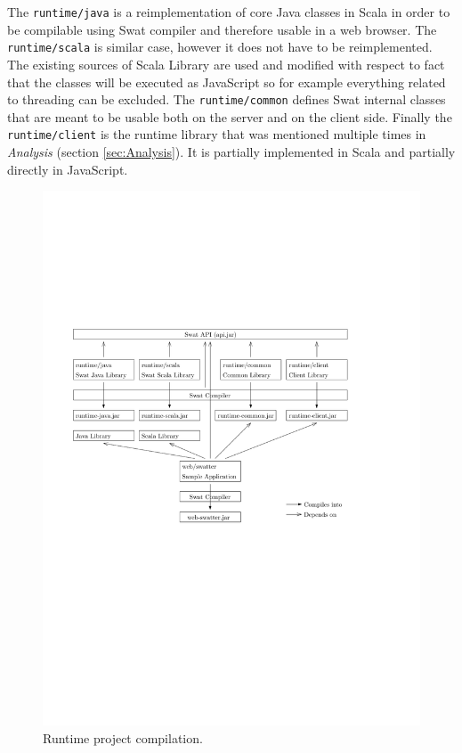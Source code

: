 \documentclass[12pt,a4paper]{report}
\begin{document}
The \texttt{runtime/java} is a reimplementation of core Java classes in Scala in order to be compilable using Swat compiler and therefore usable in a web browser. The \texttt{runtime/scala} is similar case, however it does not have to be reimplemented. The existing sources of Scala Library are used and modified with respect to fact that the classes will be executed as JavaScript so for example everything related to threading can be excluded. The \texttt{runtime/common} defines Swat internal classes that are meant to be usable both on the server and on the client side. Finally the \texttt{runtime/client} is the runtime library that was mentioned multiple times in {\it Analysis} (section \ref{sec:Analysis}). It is partially implemented in Scala and partially directly in JavaScript.

\begin{figure}[ht]
  \centering
	\includegraphics[width=\linewidth,height=\textheight,keepaspectratio]{img/Project.pdf}
	\caption{Runtime project compilation.}
	\label{Project}
\end{figure}
\end{document}
